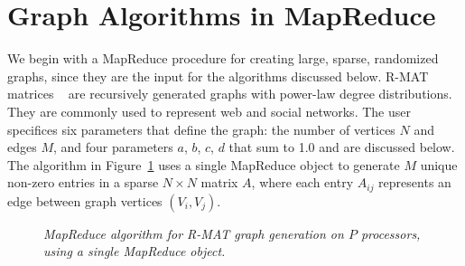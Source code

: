 \section{Graph Algorithms in MapReduce}
\label{sec:graph}

We begin with a MapReduce procedure for creating large, sparse,
randomized graphs, since they are the input for the algorithms
discussed below.  R-MAT matrices ~\cite{RMAT} are recursively
generated graphs with power-law degree distributions.  They are
commonly used to represent web and social networks.  The user
specifices six parameters that define the graph: the number of
vertices $N$ and edges $M$, and four parameters $a$, $b$, $c$, $d$
that sum to 1.0 and are discussed below.  The algorithm in
Figure~\ref{fig:rmat} uses a single MapReduce object to generate $M$
unique non-zero entries in a sparse $N \times N$ matrix $A$, where
each entry $A_{ij}$ represents an edge between graph vertices
$(V_i,V_j)$.

\begin{figure}[htb]
 \begin{center}\end{center}

 \caption{\it MapReduce algorithm for R-MAT graph generation on $P$
 processors, using a single MapReduce object.}

 \label{fig:rmat}
\end{figure}

